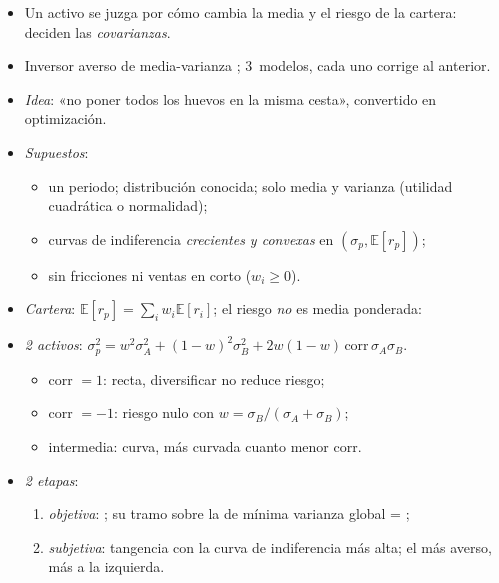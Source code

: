 \documentclass{article}
\begin{document}
\begin{columnas}
\begin{itemize}
\item Un activo se juzga por cómo cambia la media y el riesgo de la cartera: deciden las \emph{covarianzas}.
\item Inversor averso de media-varianza ; 3~modelos, cada uno corrige al anterior.
\end{itemize}
\begin{itemize}
\item \emph{Idea}: «no poner todos los huevos en la misma cesta», convertido en optimización.
\item \emph{Supuestos}:
  \begin{itemize}
  \item un periodo; distribución conocida; solo media y varianza (utilidad cuadrática o normalidad);
  \item curvas de indiferencia \emph{crecientes y convexas} en $(\sigma_p,\mathbb{E}[r_p])$;
  \item sin fricciones ni ventas en corto ($w_i\geq0$).
  \end{itemize}
\item \emph{Cartera}: $\mathbb{E}[r_p]=\sum_iw_i\mathbb{E}[r_i]$; el riesgo \emph{no} es media ponderada:
\item \emph{2 activos}: $\sigma_p^2=w^2\sigma_A^2+(1-w)^2\sigma_B^2+2w(1-w)\,\mathrm{corr}\,\sigma_A\sigma_B$.
  \begin{itemize}
  \item corr $=1$: recta, diversificar no reduce riesgo;
  \item corr $=-1$: riesgo nulo con $w=\sigma_B/(\sigma_A+\sigma_B)$;
  \item intermedia: curva, más curvada cuanto menor corr.
  \end{itemize}
\end{itemize}
\begin{itemize}
\item \emph{2 etapas}:
  \begin{enumerate}
  \item \emph{objetiva}: ; su tramo sobre la de mínima varianza global = ;
  \item \emph{subjetiva}: tangencia con la curva de indiferencia más alta; el más averso, más a la izquierda.

\end{enumerate}
\end{itemize}
\end{columnas}
\end{document}
